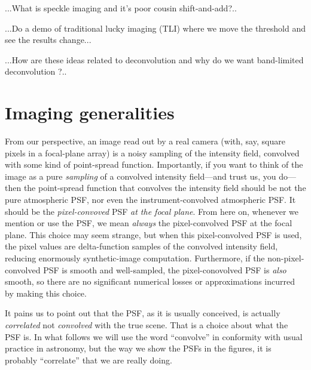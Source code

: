 \documentclass[12pt,preprint]{aastex}
\begin{document}
...What is speckle imaging and it's poor cousin shift-and-add?..

...Do a demo of traditional lucky imaging (TLI) where we move the
threshold and see the results change...

...How are these ideas related to deconvolution \citep{hirsch} and why
do we want band-limited deconvolution \citep{magain}?..

\section{Imaging generalities}

From our perspective, an image read out by a real camera (with, say,
square pixels in a focal-plane array) is a noisy sampling of the
intensity field, convolved with some kind of point-spread function.
Importantly, if you want to think of the image as a pure
\emph{sampling} of a convolved intensity field---and trust us, you
do---then the point-spread function that convolves the intensity field
should be not the pure atmospheric PSF, nor even the
instrument-convolved atmospheric PSF.  It should be the
\emph{pixel-convoved} PSF \emph{at the focal plane}.  From here on,
whenever we mention or use the PSF, we mean \emph{always} the
pixel-convolved PSF at the focal plane.  This choice may seem strange,
but when this pixel-convolved PSF is used, the pixel values are
delta-function samples of the convolved intensity field, reducing
enormously synthetic-image computation.  Furthermore, if the
non-pixel-convolved PSF is smooth and well-sampled, the
pixel-conovolved PSF is \emph{also} smooth, so there are no significant
numerical losses or approximations incurred by making this choice.

It pains us to point out that the PSF, as it is usually conceived, is
actually \emph{correlated} not \emph{convolved} with the true scene.
That is a choice about what the PSF is.  In what follows we will use
the word ``convolve'' in conformity with usual practice in astronomy,
but the way we show the PSFs in the figures, it is probably
``correlate'' that we are really doing.
\end{document}
